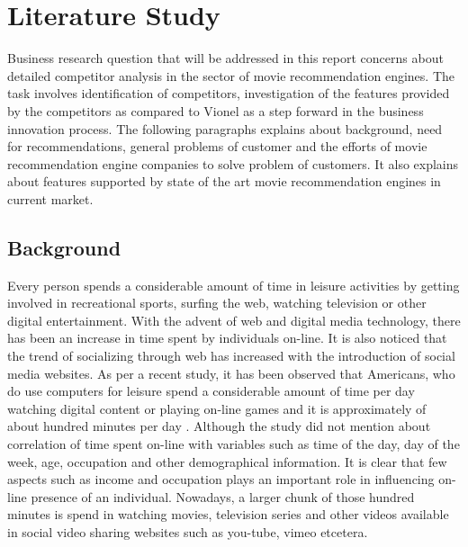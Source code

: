 \chapter{Literature Study} %

\label{Chapter2} %



Business research question that will be addressed in this report concerns about detailed competitor analysis in the sector of movie recommendation engines. The task involves identification of competitors, investigation of the features provided by the competitors as compared to Vionel as a step forward in the business innovation process. The following paragraphs explains about background, need for recommendations, general problems of customer and the efforts of movie recommendation engine companies to solve problem of customers. It also explains about features supported by state of the art movie recommendation engines in current market.

\section {Background}

Every person spends a considerable amount of time in leisure activities by getting involved in recreational sports, surfing the web, watching television or other digital entertainment. With the advent of web and digital media technology, there has been an increase in time spent by  individuals on-line. It is also noticed that the trend of socializing through web has increased with the introduction of social media websites. As per a recent study, it has been observed that Americans, who do use computers for leisure spend a considerable amount of time per day watching digital content or playing on-line games and it is approximately of about hundred minutes per day \citep{time_spent_online}. Although the study did not mention about correlation of time spent on-line with variables such as time of the day, day of the week, age, occupation and other demographical information. It is clear that few aspects such as income and occupation plays an important role in influencing on-line presence of an individual. Nowadays, a larger chunk of those hundred minutes is spend in watching movies, television series and other videos available in social video sharing websites such as you-tube, vimeo etcetera.

